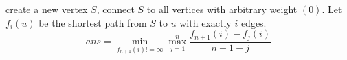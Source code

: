 create a new vertex $S$, connect $S$ to all vertices with arbitrary weight $(0)$.
Let $f_i(u)$ be the shortest path from $S$ to $u$ with exactly $i$ edges.
$$ans = \min_{f_{n + 1}(i) != \infty} \max_{j = 1}^{n} \frac{f_{n + 1}{(i)} - f_{j}{(i)}}{n + 1 - j}$$

